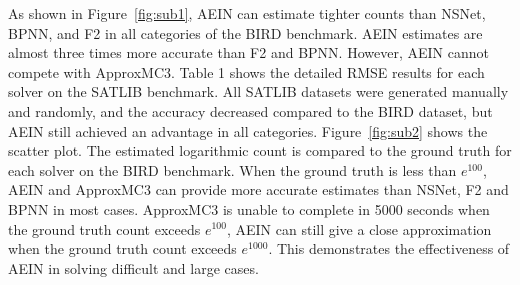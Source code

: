 As shown in Figure~\ref{fig:sub1}, AEIN can estimate tighter counts than NSNet, BPNN, and F2 in all categories of the BIRD benchmark. AEIN estimates are almost three times more accurate than F2 and BPNN. However, AEIN cannot compete with ApproxMC3.
Table 1 shows the detailed RMSE results for each solver on the SATLIB benchmark. All SATLIB datasets were generated manually and randomly, and the accuracy decreased compared to the BIRD dataset, but AEIN still achieved an advantage in all categories.
Figure~\ref{fig:sub2} shows the scatter plot. The estimated logarithmic count is compared to the ground truth for each solver on the BIRD benchmark. When the ground truth is less than \(e^{100}\), AEIN and ApproxMC3 can provide more accurate estimates than NSNet, F2 and BPNN in most cases. ApproxMC3 is unable to complete in 5000 seconds when the ground truth count exceeds \(e^{100}\), AEIN can still give a close approximation when the ground truth count exceeds \(e^{1000}\). This demonstrates the effectiveness of AEIN in solving difficult and large cases.

